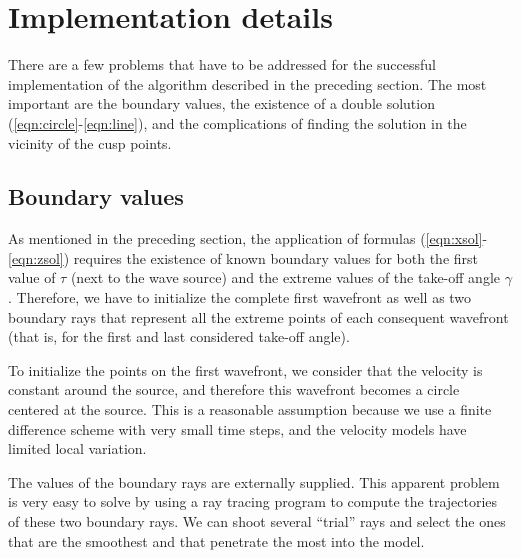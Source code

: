 
\section{Implementation details}

There are a few problems that have to be addressed for the successful
implementation of the algorithm described in the preceding section. The
most important are the boundary values, the existence of a double
solution (\ref{eqn:circle}-\ref{eqn:line}), and the complications of
finding the solution in the vicinity of the cusp points.

\subsection{Boundary values}

As mentioned in the preceding section, the application of formulas
(\ref{eqn:xsol}-\ref{eqn:zsol}) requires the existence of known boundary
values for both the first value of $\tau$ (next to the wave source)
and the extreme values of the take-off angle $\gamma$. Therefore,
we have to initialize the complete first wavefront as well as two
boundary rays that represent all the extreme points of each consequent
wavefront (that is, for the first and last considered take-off angle).
\par
To initialize the points on the first wavefront, we consider that the
velocity is constant around the source, and therefore this wavefront
becomes a circle centered at the source. This is a reasonable assumption
because we use a finite difference scheme with very small time steps, and
the velocity models have limited local variation.
\par
The values of the boundary rays are externally supplied. This apparent
problem is very easy to solve by using a ray tracing program to compute
the trajectories of these two boundary rays. We can shoot
several ``trial'' rays and select the ones that are the smoothest and that
penetrate the most into the model.


